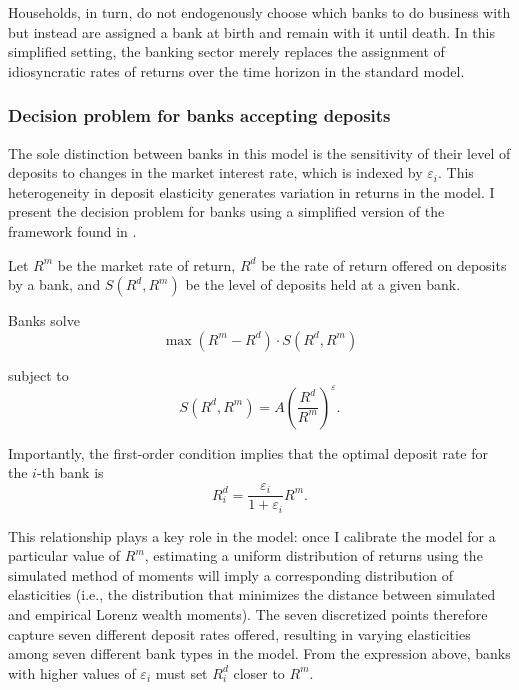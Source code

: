 \par Households, in turn, do not endogenously choose which banks to do business with but instead are assigned a bank at birth and remain with it until death. In this simplified setting, the banking sector merely replaces the assignment of idiosyncratic rates of returns over the time horizon in the standard model. 

\subsubsection{Decision problem for banks accepting deposits}

\par The sole distinction between banks in this model is the sensitivity of their level of deposits to changes in the market interest rate, which is indexed by $\varepsilon_i$. This heterogeneity in deposit elasticity generates variation in returns in the model. I present the decision problem for banks using a simplified version of the framework found in \cite{Paul2024}.

 \par Let $R^m$ be the market rate of return, $R^d$ be the rate of return offered on deposits by a  bank, and $S(R^d, R^m)$ be the level of deposits held at a given bank.

\par Banks solve
\[
\max (R^m - R^d) \cdot S(R^d, R^m)
\]

\par subject to
\[
S(R^d, R^m) = A \left( \frac{R^d}{R^m} \right)^{\varepsilon}.
\]

\par Importantly, the first-order condition implies that the optimal deposit rate for the $i$-th bank is $$ R_i^d = \frac{\varepsilon_i}{1+\varepsilon_i} R^m.  $$

\par This relationship plays a key role in the model: once I calibrate the model for a particular value of $R^m$, estimating a uniform distribution of returns using the simulated method of moments will imply a corresponding distribution of elasticities (i.e., the distribution  that minimizes the distance between simulated and empirical Lorenz wealth moments). The seven discretized points therefore capture seven different deposit rates offered, resulting in varying elasticities among seven different bank types in the model. From the expression above, banks with higher values of $\varepsilon_i$  must set $R_i^d$ closer to $R^m$.

